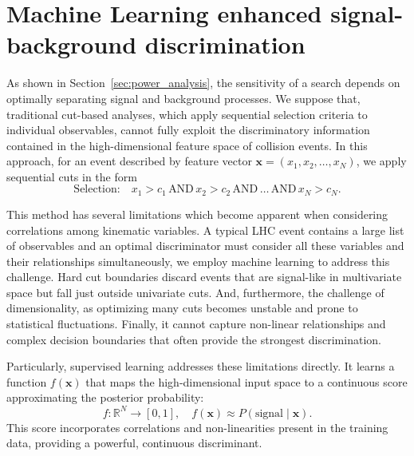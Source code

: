 \section{Machine Learning enhanced signal-background discrimination}
\label{sec:machine_learning}

As shown in Section~\ref{sec:power_analysis}, the sensitivity of a search depends on optimally separating signal and background processes. We suppose that, traditional cut-based analyses, which apply sequential selection criteria to individual observables, cannot fully exploit the discriminatory information contained in the high-dimensional feature space of collision events. In this approach, for an event described by feature vector $\mathbf{x} = (x_1, x_2, \ldots, x_N)$, we apply sequential cuts in the form
\begin{equation}
\text{Selection:} \quad x_1 > c_1 \,\text{AND}\, x_2 > c_2 \,\text{AND}\, \ldots \,\text{AND}\, x_N > c_N.
\end{equation}

This method has several limitations which become apparent when considering correlations among kinematic variables. A typical LHC event contains a large list of observables and an optimal discriminator must consider all these variables and their relationships simultaneously, we employ machine learning to address this challenge. Hard cut boundaries discard events that are signal-like in multivariate space but fall just outside univariate cuts. And, furthermore, the challenge of dimensionality, as optimizing many cuts becomes unstable and prone to statistical fluctuations. Finally, it cannot capture non-linear relationships and complex decision boundaries that often provide the strongest discrimination.

Particularly, supervised learning addresses these limitations directly. It learns a function $f(\mathbf{x})$ that maps the high-dimensional input space to a continuous score approximating the posterior probability:
\begin{equation}
f: \mathbb{R}^N \rightarrow [0,1], \quad f(\mathbf{x}) \approx P(\text{signal} \mid \mathbf{x}).
\end{equation}
This score incorporates correlations and non-linearities present in the training data, providing a powerful, continuous discriminant.

